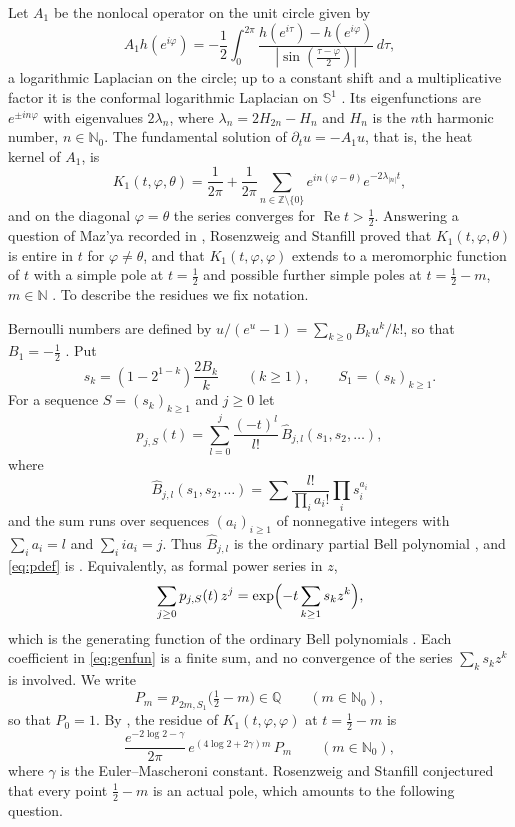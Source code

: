\documentclass[11pt]{amsart}
\theoremstyle{definition}
\theoremstyle{remark}
\numberwithin{equation}{section}
\newcommand{\N}{\mathbb{N}}
\newcommand{\Z}{\mathbb{Z}}
\newcommand{\Q}{\mathbb{Q}}
\newcommand{\Bhat}{\widehat{B}}
\begin{document}
Let $A_1$ be the nonlocal operator on the unit circle given by
\[
  A_1h(e^{i\varphi})=-\frac12\int_0^{2\pi}\frac{h(e^{i\tau})-h(e^{i\varphi})}{|\sin(\frac{\tau-\varphi}{2})|}\,d\tau ,
\]
a logarithmic Laplacian on the circle; up to a constant shift and a multiplicative factor it is the conformal logarithmic Laplacian on $\mathbb{S}^1$ \cite[Section~1]{RS}. Its eigenfunctions are $e^{\pm in\varphi}$ with eigenvalues $2\lambda_n$, where $\lambda_n=2H_{2n}-H_n$ and $H_n$ is the $n$th harmonic number, $n\in\N_0$. The fundamental solution of $\partial_tu=-A_1u$, that is, the heat kernel of $A_1$, is
\[
  K_1(t,\varphi,\theta)=\frac1{2\pi}+\frac1{2\pi}\sum_{n\in\Z\setminus\{0\}}e^{in(\varphi-\theta)}e^{-2\lambda_{|n|}t},
\]
and on the diagonal $\varphi=\theta$ the series converges for $\operatorname{Re}t>\frac12$. Answering a question of Maz'ya recorded in \cite{RS}, Rosenzweig and Stanfill proved that $K_1(t,\varphi,\theta)$ is entire in $t$ for $\varphi\ne\theta$, and that $K_1(t,\varphi,\varphi)$ extends to a meromorphic function of $t$ with a simple pole at $t=\frac12$ and possible further simple poles at $t=\frac12-m$, $m\in\N$ \cite[Theorem~1.2]{RS}. To describe the residues we fix notation.

Bernoulli numbers are defined by $u/(e^u-1)=\sum_{k\ge0}B_ku^k/k!$, so that $B_1=-\frac12$ \cite[Section~24.2(i)]{DLMF}. Put
\begin{equation}\label{eq:s}
  s_k=(1-2^{1-k})\frac{2B_k}{k}\qquad(k\ge1),\qquad S_1=(s_k)_{k\ge1}.
\end{equation}
For a sequence $S=(s_k)_{k\ge1}$ and $j\ge0$ let
\begin{equation}\label{eq:pdef}
  p_{j,S}(t)=\sum_{l=0}^{j}\frac{(-t)^l}{l!}\,\Bhat_{j,l}(s_1,s_2,\dots),
\end{equation}
where
\[
  \Bhat_{j,l}(s_1,s_2,\dots)=\sum\frac{l!}{\prod_i a_i!}\prod_i s_i^{a_i}
\]
and the sum runs over sequences $(a_i)_{i\ge1}$ of nonnegative integers with $\sum_ia_i=l$ and $\sum_iia_i=j$. Thus $\Bhat_{j,l}$ is the ordinary partial Bell polynomial \cite{OS}, and \eqref{eq:pdef} is \cite[Definition~1.1]{RS}. Equivalently, as formal power series in $z$,
\begin{equation}\label{eq:genfun}
  \sum_{j\ge0}p_{j,S}(t)\,z^j=\exp\Bigl(-t\sum_{k\ge1}s_kz^k\Bigr),
\end{equation}
which is the generating function of the ordinary Bell polynomials \cite[(2.6)]{RS}. Each coefficient in \eqref{eq:genfun} is a finite sum, and no convergence of the series $\sum_k s_kz^k$ is involved. We write
\[
  P_m=p_{2m,S_1}\bigl(\tfrac12-m\bigr)\in\Q\qquad(m\in\N_0),
\]
so that $P_0=1$. By \cite[Theorem~1.2, (1.7)]{RS}, the residue of $K_1(t,\varphi,\varphi)$ at $t=\frac12-m$ is
\begin{equation}\label{eq:residue}
  \frac{e^{-2\log2-\gamma}}{2\pi}\,e^{(4\log2+2\gamma)m}\,P_m\qquad(m\in\N_0),
\end{equation}
where $\gamma$ is the Euler--Mascheroni constant. Rosenzweig and Stanfill conjectured that every point $\frac12-m$ is an actual pole, which amounts to the following question.
\end{document}
